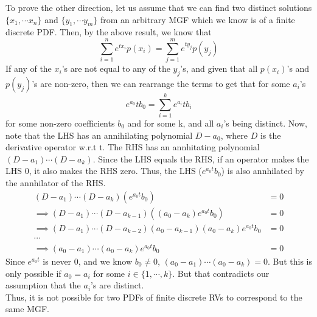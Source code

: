 To prove the other direction, let us assume that we can find two distinct solutions $\{x_1,\cdots x_n\}$ and $\{y_1,\cdots y_m\}$ from an arbitrary MGF which we know is of a finite discrete PDF. Then, by the above result, we know that
\[
    \sum_{i=1}^n e^{tx_i} p(x_i) = \sum_{j=1}^m e^{ty_j} p(y_j)
\]
If any of the $x_i$'s are not equal to any of the $y_j$'s, and given that all $p(x_i)$'s and $p(y_j)$'s are non-zero, then we can rearrange the terms to get that for some $a_i$'s
\[
    e^{a_0}t b_0 = \sum_{i=1}^k e^{a_i}t b_i
\]
for some non-zero coefficients $b_0$ and for some k, and all $a_i$'s being distinct. Now, note that the LHS has an annihilating polynomial $D-a_0$, where $D$ is the derivative operator w.r.t t. The RHS has an annhitating polynomial $(D-a_1)\cdots(D-a_k)$. Since the LHS equals the RHS, if an operator makes the LHS 0, it also makes the RHS zero. Thus, the LHS ($e^{a_0t}b_0$) is also annhilated by the annhilator of the RHS.
\begin{align*}
    (D-a_1)\cdots(D-a_k)(e^{a_0t}b_0) &= 0\\
    \implies (D-a_1)\cdots(D-a_{k-1})((a_0-a_k)e^{a_0t}b_0) &= 0\\
    \implies (D-a_1)\cdots(D-a_{k-2})(a_0-a_{k-1})(a_0-a_k)e^{a_0t}b_0 &= 0\\
    \cdots\\
    \implies (a_0-a_1)\cdots(a_0-a_k)e^{a_0t}b_0 &= 0
\end{align*}
Since $e^{a_0t}$ is never 0, and we know $b_0\ne 0$, $(a_0-a_1)\cdots(a_0-a_k)=0$. But this is only possible if $a_0 = a_i$ for some $i \in \{1,\cdots, k\}$. But that contradicts our assumption that the $a_i$'s are distinct.\\

Thus, it is not possible for two PDFs of finite discrete RVs to correspond to the same MGF.\\

